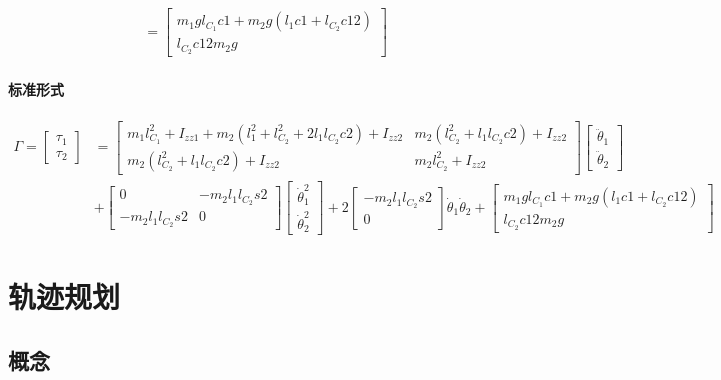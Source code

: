 \documentclass[
12pt, %
a4paper, 
oneside, %
headinclude,footinclude, %
]{scrartcl}
\begin{document}
{\begin{enumerate}
\begin{align*}
&= \begin{bmatrix} m_1 g l_{C_1}c1 + m_2 g(l_1 c1 + l_{C_2}c12) \\ l_{C_2}c12 m_2 g \end{bmatrix}
\end{align*}
\end{enumerate}
\paragraph{标准形式}
\begin{align*}
\Gamma = \begin{bmatrix} \tau_1 \\ \tau_2 \end{bmatrix}
&= \begin{bmatrix} 
m_1 l_{C_1}^2 + I_{zz1} + m_2(l_1^2 + l_{C_2}^2 + 2l_1 l_{C_2}c2) + I_{zz2} & m_2(l_{C_2}^2 + l_1 l_{C_2}c2) + I_{zz2} \\
m_2(l_{C_2}^2 + l_1 l_{C_2}c2) + I_{zz2} & m_2 l_{C_2}^2 + I_{zz2}
\end{bmatrix} 
\begin{bmatrix} \ddot{\theta}_1 \\ \ddot{\theta}_2 \end{bmatrix} \\  
&+ \begin{bmatrix} 0 & -m_2 l_1 l_{C_2}s2 \\ -m_2 l_1 l_{C_2}s2 & 0 \end{bmatrix} \begin{bmatrix} \dot{\theta}_1^2 \\ \dot{\theta}_2^2 \end{bmatrix}
+ 2\begin{bmatrix} -m_2 l_1 l_{C_2}s2 \\ 0 \end{bmatrix} \dot{\theta}_1 \dot{\theta}_2 
+ \begin{bmatrix} m_1 g l_{C_1}c1 + m_2 g(l_1 c1 + l_{C_2}c12) \\ l_{C_2}c12 m_2 g \end{bmatrix} 
\end{align*}
}
\section{轨迹规划}
\subsection[概念]{概念}
\end{document}
